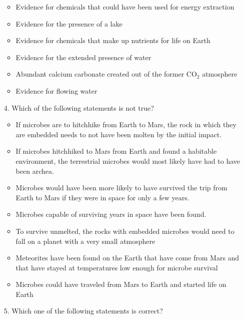 \begin{enumerate}
\begin{itemize}[label={$\bullet$}]
    \item Evidence for chemicals that could have been used for energy extraction
    \item Evidence for the presence of a lake
    \item Evidence for chemicals that make up nutrients for life on Earth
    \item Evidence for the extended presence of water
    \item Abundant calcium carbonate created out of the former CO$_2$ atmosphere
    \item Evidence for flowing water
\end{itemize}

\item[4.] Which of the following statements is not true?

\begin{itemize}[label={$\bullet$}]
    \item If microbes are to hitchhike from Earth to Mars, the rock in which they are embedded needs to not have been molten by the initial impact.
    \item If microbes hitchhiked to Mars from Earth and found a habitable environment, the terrestrial microbes would most likely have had to have been archea.
    \item Microbes would have been more likely to have survived the trip from Earth to Mars if they were in space for only a few years.
    \item Microbes capable of surviving years in space have been found.
    \item To survive unmelted, the rocks with embedded microbes would need to fall on a planet with a very small atmosphere
    \item Meteorites have been found on the Earth that have come from Mars and that have stayed at temperatures low enough for microbe survival
    \item Microbes could have traveled from Mars to Earth and started life on Earth
\end{itemize}

\item[5.] Which one of the following statements is correct?


\end{enumerate}
